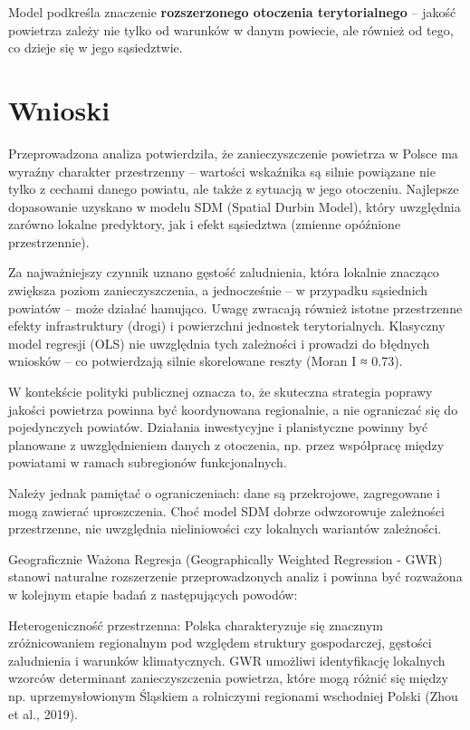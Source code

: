 \documentclass[
  11pt,
]{article}
\begin{document}
Model podkreśla znaczenie \textbf{rozszerzonego otoczenia
terytorialnego} -- jakość powietrza zależy nie tylko od warunków w danym
powiecie, ale również od tego, co dzieje się w jego sąsiedztwie.

\section{Wnioski}\label{wnioski}

Przeprowadzona analiza potwierdziła, że zanieczyszczenie powietrza w
Polsce ma wyraźny charakter przestrzenny -- wartości wskaźnika są silnie
powiązane nie tylko z cechami danego powiatu, ale także z sytuacją w
jego otoczeniu. Najlepsze dopasowanie uzyskano w modelu SDM (Spatial
Durbin Model), który uwzględnia zarówno lokalne predyktory, jak i efekt
sąsiedztwa (zmienne opóźnione przestrzennie).

Za najważniejszy czynnik uznano gęstość zaludnienia, która lokalnie
znacząco zwiększa poziom zanieczyszczenia, a jednocześnie -- w przypadku
sąsiednich powiatów -- może działać hamująco. Uwagę zwracają również
istotne przestrzenne efekty infrastruktury (drogi) i powierzchni
jednostek terytorialnych. Klasyczny model regresji (OLS) nie uwzględnia
tych zależności i prowadzi do błędnych wniosków -- co potwierdzają
silnie skorelowane reszty (Moran I ≈ 0.73).

W kontekście polityki publicznej oznacza to, że skuteczna strategia
poprawy jakości powietrza powinna być koordynowana regionalnie, a nie
ograniczać się do pojedynczych powiatów. Działania inwestycyjne i
planistyczne powinny być planowane z uwzględnieniem danych z otoczenia,
np. przez współpracę między powiatami w ramach subregionów
funkcjonalnych.

Należy jednak pamiętać o ograniczeniach: dane są przekrojowe,
zagregowane i mogą zawierać uproszczenia. Choć model SDM dobrze
odwzorowuje zależności przestrzenne, nie uwzględnia nieliniowości czy
lokalnych wariantów zależności.

Geograficznie Ważona Regresja (Geographically Weighted Regression - GWR)
stanowi naturalne rozszerzenie przeprowadzonych analiz i powinna być
rozważona w kolejnym etapie badań z następujących powodów:

Heterogeniczność przestrzenna: Polska charakteryzuje się znacznym
zróżnicowaniem regionalnym pod względem struktury gospodarczej, gęstości
zaludnienia i warunków klimatycznych. GWR umożliwi identyfikację
lokalnych wzorców determinant zanieczyszczenia powietrza, które mogą
różnić się między np. uprzemysłowionym Śląskiem a rolniczymi regionami
wschodniej Polski (Zhou et al., 2019).
\end{document}
